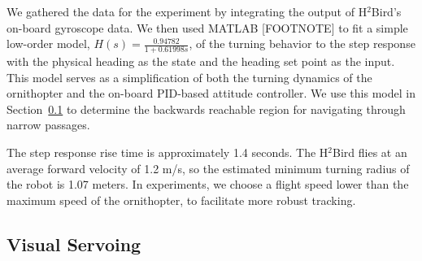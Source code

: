 \documentclass{aamas2013}
\begin{document}
We gathered the data for the experiment by integrating the output of 
H$^2$Bird's on-board gyroscope data. We then used MATLAB [FOOTNOTE] to fit a 
simple low-order model, $H(s) = \frac{0.94782}{1+0.61998s}$, of the turning 
behavior to the step response with the physical heading as the state and the 
heading set point as the input. This model serves as a simplification of 
both the turning dynamics of the ornithopter and the on-board PID-based 
attitude controller. We use this model in Section~\ref{sec:visual_servoing} 
to determine the backwards reachable region for navigating through narrow passages.

The step response rise time is approximately 1.4 seconds. The H$^2$Bird
flies at an average forward velocity of 1.2 m/s, so the estimated minimum
turning radius of the robot is 1.07 meters. In experiments, we choose a flight
speed lower than the maximum speed of the ornithopter, to facilitate more
robust tracking.

\subsection{Visual Servoing}
\label{sec:visual_servoing}
\end{document}
